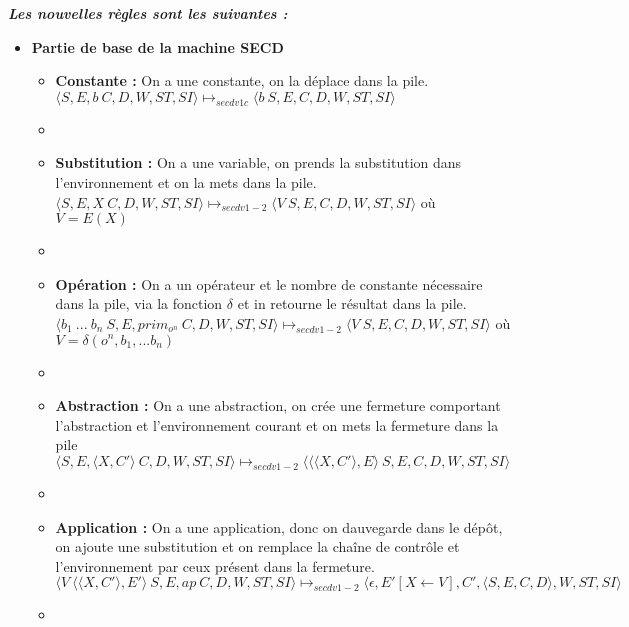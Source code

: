 \documentclass[10pt,a4paper]{article}
\begin{document}
					
				\textbf{\textit{Les nouvelles règles sont les suivantes :}}
				\smallbreak
				\begin{itemize}
					\item[] \textbf{Partie de base de la machine SECD}
					\begin{itemize}
						\item[] \textbf{Constante :} On a une constante, on la déplace dans la pile. 
						\smallbreak
						$\langle S,E,b~C,D,W,ST,SI\rangle 
						\longmapsto_{secdv1c} 
						\langle b~S,E,C,D,W,ST,SI\rangle$
						\item[]
						
						\item[] \textbf{Substitution :} On a une variable, on prends la substitution dans l'environnement et on la mets dans la pile.  
						\smallbreak 
						$\langle S,E,X~C,D,W,ST,SI\rangle 
						\longmapsto_{secdv1-2} 
						\langle V~S,E,C,D,W,ST,SI\rangle$ 
						où $V = E(X)$
						\item[]
						
						\item[] \textbf{Opération :} On a un opérateur et le nombre de constante nécessaire dans la pile, via la fonction $\delta$ et in retourne le résultat dans la pile. 
						\smallbreak
						$\langle b_{1}~...~b_{n}~S,E,prim_{o^{n}}~C,D,W,ST,SI\rangle 
						\longmapsto_{secdv1-2} 
						\langle V~S,E,C,D,W,ST,SI\rangle$ 
						où $V = \delta(o^{n},b_1,...b_{n})$
						\item[]
						
						\item[] \textbf{Abstraction :} On a une abstraction, on crée une fermeture comportant l'abstraction et l'environnement courant et on mets la fermeture dans la pile
						\smallbreak
						$\langle S,E,\langle X,C'\rangle~C,D,W,ST,SI\rangle 
						\longmapsto_{secdv1-2} 
						\langle\langle\langle X,C'\rangle,E\rangle~S,E,C,D,W,ST,SI\rangle$
						\item[]
						
						\item[] \textbf{Application :} On a une application, donc on dauvegarde dans le dépôt, on ajoute une substitution et on remplace la chaîne de contrôle et l'environnement par ceux présent dans la fermeture.
						\smallbreak
						$\langle V~\langle\langle X,C'\rangle,E'\rangle~S,E,ap~C,D,W,ST,SI\rangle 
						\longmapsto_{secdv1-2} 
						\langle\epsilon,E'[X \leftarrow V],C',\langle S,E,C,D\rangle,W,ST,SI\rangle$
						\item[]
						

\end{itemize}
\end{itemize}
\end{document}
